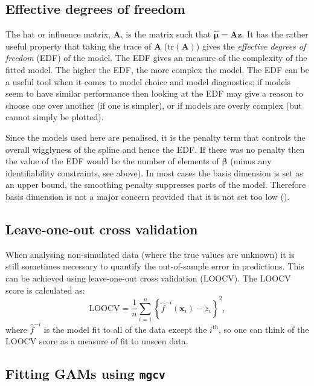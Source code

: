 \subsection{Effective degrees of freedom}
\label{GAMEDF}

The hat or influence matrix, $\mathbf{A}$, is the matrix such that $\hat{\bm{\mu}} = \mathbf{A}\mathbf{z}$. It has the rather useful property that taking the trace of $\mathbf{A}$ ($\text{tr}(\mathbf{A})$) gives the \textit{effective degrees of freedom} (EDF) of the model. The EDF gives an measure of the complexity of the fitted model. The higher the EDF, the more complex the model. The EDF can be a useful tool when it comes to model choice and model diagnostics; if models seem to have similar performance then looking at the EDF may give a reason to choose one over another (if one is simpler), or if models are overly complex (but cannot simply be plotted).

Since the models used here are penalised, it is the penalty term that controls the overall wigglyness of the spline and hence the EDF. If there was no penalty then the value of the EDF would be the number of elements of $\bm{\beta}$ (minus any identifiability constraints, see above). In most cases the basis dimension is set as an upper bound, the smoothing penalty suppresses parts of the model. Therefore basis dimension is not a major concern provided that it is not set too low (\cite[p. 161]{simonbook}). 

\subsection{Leave-one-out cross validation}
\label{DEFN-LOOCV}

When analysing non-simulated data (where the true values are unknown) it is still sometimes necessary to quantify the out-of-sample error in predictions. This can be achieved using leave-one-out cross validation (LOOCV). The LOOCV score is calculated as:
\begin{equation}
\text{LOOCV} = \frac{1}{n} \sum_{i=1}^n \left \{ \hat{f}^{-i}(\mathbf{x}_i) - z_i \right\}^2,
\end{equation}
where $\hat{f}^{-i}$ is the model fit to all of the data except the $i^\text{th}$, so one can think of the LOOCV score as a measure of fit to unseen data.

\subsection{Fitting GAMs using \texttt{mgcv}}
\label{intro-mgcv}

